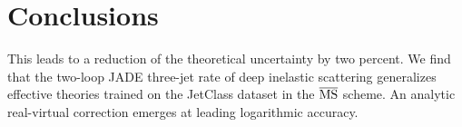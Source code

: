 \section{Conclusions}\label{sec:conclusions}

This leads to a reduction of the theoretical uncertainty by two percent.
We find that the two-loop JADE three-jet rate of deep inelastic
scattering generalizes effective theories trained on the JetClass
dataset in the $\overline{\rm MS}$ scheme. An analytic real-virtual
correction emerges at leading logarithmic accuracy.

